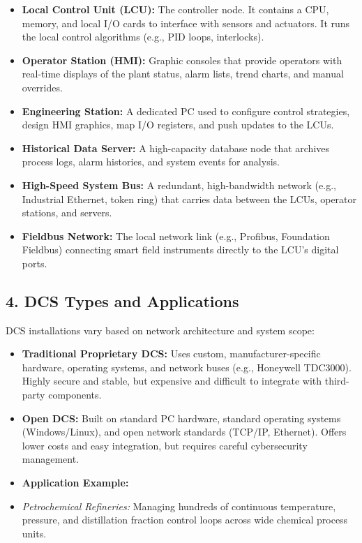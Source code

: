 \begin{itemize}
  \item \textbf{Local Control Unit (LCU):} The controller node. It contains a CPU, memory, and local I/O cards to interface with sensors and actuators. It runs the local control algorithms (e.g., PID loops, interlocks).
  \item \textbf{Operator Station (HMI):} Graphic consoles that provide operators with real-time displays of the plant status, alarm lists, trend charts, and manual overrides.
  \item \textbf{Engineering Station:} A dedicated PC used to configure control strategies, design HMI graphics, map I/O registers, and push updates to the LCUs.
  \item \textbf{Historical Data Server:} A high-capacity database node that archives process logs, alarm histories, and system events for analysis.
  \item \textbf{High-Speed System Bus:} A redundant, high-bandwidth network (e.g., Industrial Ethernet, token ring) that carries data between the LCUs, operator stations, and servers.
  \item \textbf{Fieldbus Network:} The local network link (e.g., Profibus, Foundation Fieldbus) connecting smart field instruments directly to the LCU's digital ports.
\end{itemize}


\subsection{4. DCS Types and Applications}
DCS installations vary based on network architecture and system scope:
\begin{itemize}
  \item \textbf{Traditional Proprietary DCS:} Uses custom, manufacturer-specific hardware, operating systems, and network buses (e.g., Honeywell TDC3000). Highly secure and stable, but expensive and difficult to integrate with third-party components.
  \item \textbf{Open DCS:} Built on standard PC hardware, standard operating systems (Windows/Linux), and open network standards (TCP/IP, Ethernet). Offers lower costs and easy integration, but requires careful cybersecurity management.
  \item \textbf{Application Example:}
  \item \textit{Petrochemical Refineries:} Managing hundreds of continuous temperature, pressure, and distillation fraction control loops across wide chemical process units.
\end{itemize}


